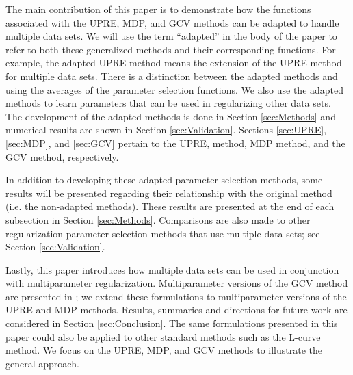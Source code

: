 \documentclass[12pt]{article}
\begin{document}
The main contribution of this paper is to demonstrate how the functions associated with the UPRE, MDP, and GCV methods can be adapted to handle multiple data sets. We will use the term ``adapted'' in the body of the paper to refer to both these generalized methods and their corresponding functions. For example, the adapted UPRE method means the extension of the UPRE method for multiple data sets. There is a distinction between the adapted methods and using the averages of the parameter selection functions. We also use the adapted methods to learn parameters that can be used in regularizing other data sets. The development of the adapted methods is done in Section \ref{sec:Methods} and numerical results are shown in Section \ref{sec:Validation}. Sections \ref{sec:UPRE}, \ref{sec:MDP}, and \ref{sec:GCV} pertain to the UPRE, method, MDP method, and the GCV method, respectively.  \par 
In addition to developing these adapted parameter selection methods, some results will be presented regarding their relationship with the original method (i.e. the non-adapted methods). These results are presented at the end of each subsection in Section \ref{sec:Methods}. Comparisons are also made to other regularization parameter selection methods that use multiple data sets; see Section \ref{sec:Validation}. \par
Lastly, this paper introduces how multiple data sets can be used in conjunction with multiparameter regularization. Multiparameter versions of the GCV method are presented in \cite{ChungEasleyOLeary,ModarresiGolub2}; we extend these formulations to multiparameter versions of the UPRE and MDP methods. Results, summaries and directions for future work are considered in Section \ref{sec:Conclusion}. The same formulations presented in this paper could also be applied to other standard methods such as the L-curve method. We focus on the UPRE, MDP, and GCV methods to illustrate the general approach.
\end{document}
